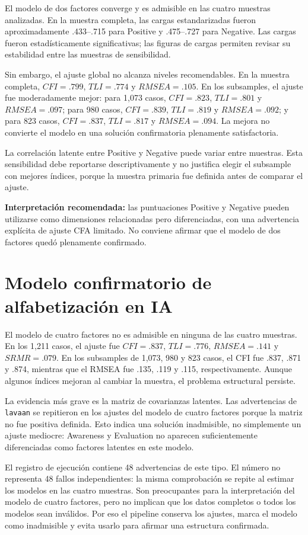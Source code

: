 \documentclass[11pt,a4paper]{article}
\begin{document}
El modelo de dos factores converge y es admisible en las cuatro muestras analizadas. En la muestra completa, las cargas estandarizadas fueron aproximadamente .433--.715 para Positive y .475--.727 para Negative. Las cargas fueron estadísticamente significativas; las figuras de cargas permiten revisar su estabilidad entre las muestras de sensibilidad.

Sin embargo, el ajuste global no alcanza niveles recomendables. En la muestra completa, $CFI=.799$, $TLI=.774$ y $RMSEA=.105$. En los subsamples, el ajuste fue moderadamente mejor: para 1,073 casos, $CFI=.823$, $TLI=.801$ y $RMSEA=.097$; para 980 casos, $CFI=.839$, $TLI=.819$ y $RMSEA=.092$; y para 823 casos, $CFI=.837$, $TLI=.817$ y $RMSEA=.094$. La mejora no convierte el modelo en una solución confirmatoria plenamente satisfactoria.

La correlación latente entre Positive y Negative puede variar entre muestras. Esta sensibilidad debe reportarse descriptivamente y no justifica elegir el subsample con mejores índices, porque la muestra primaria fue definida antes de comparar el ajuste.

\textbf{Interpretación recomendada:} las puntuaciones Positive y Negative pueden utilizarse como dimensiones relacionadas pero diferenciadas, con una advertencia explícita de ajuste CFA limitado. No conviene afirmar que el modelo de dos factores quedó plenamente confirmado.

\section{Modelo confirmatorio de alfabetización en IA}

El modelo de cuatro factores no es admisible en ninguna de las cuatro muestras. En los 1,211 casos, el ajuste fue $CFI=.837$, $TLI=.776$, $RMSEA=.141$ y $SRMR=.079$. En los subsamples de 1,073, 980 y 823 casos, el CFI fue .837, .871 y .874, mientras que el RMSEA fue .135, .119 y .115, respectivamente. Aunque algunos índices mejoran al cambiar la muestra, el problema estructural persiste.

La evidencia más grave es la matriz de covarianzas latentes. Las advertencias de \texttt{lavaan} se repitieron en los ajustes del modelo de cuatro factores porque la matriz no fue positiva definida. Esto indica una solución inadmisible, no simplemente un ajuste mediocre: Awareness y Evaluation no aparecen suficientemente diferenciadas como factores latentes en este modelo.

El registro de ejecución contiene 48 advertencias de este tipo. El número no representa 48 fallos independientes: la misma comprobación se repite al estimar los modelos en las cuatro muestras. Son preocupantes para la interpretación del modelo de cuatro factores, pero no implican que los datos completos o todos los modelos sean inválidos. Por eso el pipeline conserva los ajustes, marca el modelo como inadmisible y evita usarlo para afirmar una estructura confirmada.
\end{document}
